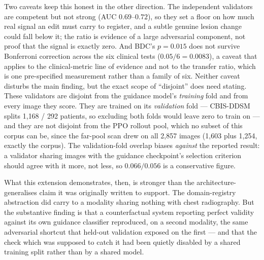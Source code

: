 \documentclass[11pt]{article}
\begin{document}
Two caveats keep this honest in the other direction. The independent
validators are competent but not strong (AUC $0.69$--$0.72$), so they set
a floor on how much real signal an edit must carry to register, and a
subtle genuine lesion change could fall below it; the ratio is evidence
of a large adversarial component, not proof that the signal is exactly
zero. And BDC's $p=0.015$ does not survive Bonferroni correction across
the six clinical tests ($0.05/6 = 0.0083$), a caveat that applies to the
clinical-metric line of evidence and not to the transfer ratio, which is
one pre-specified measurement rather than a family of six. Neither
caveat disturbs the main finding, but the exact scope of ``disjoint''
does need stating. These validators are disjoint from the guidance
model's \emph{training} fold and from every image they score. They are
trained on its \emph{validation} fold --- CBIS-DDSM splits 1{,}168 /
292 patients, so excluding both folds would leave zero to train on ---
and they are not disjoint from the PPO rollout pool, which no subset of
this corpus can be, since the far-pool scan drew on all 2{,}857 images
(1{,}603 plus 1{,}254, exactly the corpus). The validation-fold overlap
biases \emph{against} the reported result: a validator sharing images
with the guidance checkpoint's selection criterion should agree with it
more, not less, so $0.066/0.056$ is a conservative figure.

What this extension demonstrates, then, is stronger than the
architecture-generalises claim it was originally written to support. The
domain-registry abstraction did carry to a modality sharing nothing with
chest radiography. But the substantive finding is that a counterfactual
system reporting perfect validity against its own guidance classifier
reproduced, on a second modality, the same adversarial shortcut that
held-out validation exposed on the first --- and that the check which was
supposed to catch it had been quietly disabled by a shared training
split rather than by a shared model.
\end{document}
